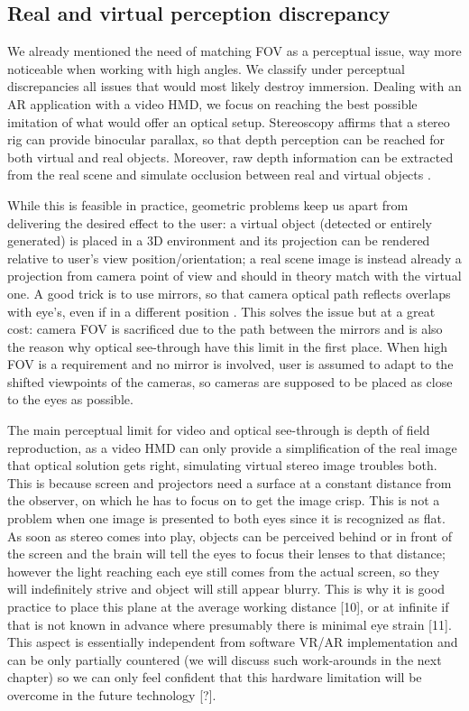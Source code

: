 \subsection{Real and virtual perception discrepancy}
We already mentioned the need of matching FOV as a perceptual issue, way more noticeable when working with high angles. We classify under perceptual discrepancies all issues that would most likely destroy immersion. Dealing with an AR application with a video HMD, we focus on reaching the best possible imitation of what would offer an optical setup. Stereoscopy affirms that a stereo rig can provide binocular parallax, so that depth perception can be reached for both virtual and real objects. Moreover, raw depth information can be extracted from the real scene and simulate occlusion between real and virtual objects \cite{GPU_accel_stereo_AR}.

While this is feasible in practice, geometric problems keep us apart from delivering the desired effect to the user: a virtual object (detected or entirely generated) is placed in a 3D environment and its projection can be rendered relative to user's view position/orientation; a real scene image is instead already a projection from camera point of view and should in theory match with the virtual one. A good trick is to use mirrors, so that camera optical path reflects overlaps with eye's, even if in a different position \cite{optical_vs_video_st}. This solves the issue but at a great cost: camera FOV is sacrificed due to the path between the mirrors and is also the reason why optical see-through have this limit in the first place. When high FOV is a requirement and no mirror is involved, user is assumed to adapt to the shifted viewpoints of the cameras, so cameras are supposed to be placed as close to the eyes as possible.

The main perceptual limit for video and optical see-through is depth of field reproduction, as a video HMD can only provide a simplification of the real image that optical solution gets right, simulating virtual stereo image troubles both. This is because screen and projectors need a surface at a constant distance from the observer, on which he has to focus on to get the image crisp. This is not a problem when one image is presented to both eyes since it is recognized as flat. As soon as stereo comes into play, objects can be perceived behind or in front of the screen and the brain will tell the eyes to focus their lenses to that distance; however the light reaching each eye still comes from the actual screen, so they will indefinitely strive and object will still appear blurry. This is why it is good practice to place this plane at the average working distance [10], or at infinite if that is not known in advance where presumably there is minimal eye strain [11]. This aspect is essentially independent from software VR/AR implementation and can be only partially countered (we will discuss such work-arounds in the next chapter) so we can only feel confident that this hardware limitation will be overcome in the future technology [?].

